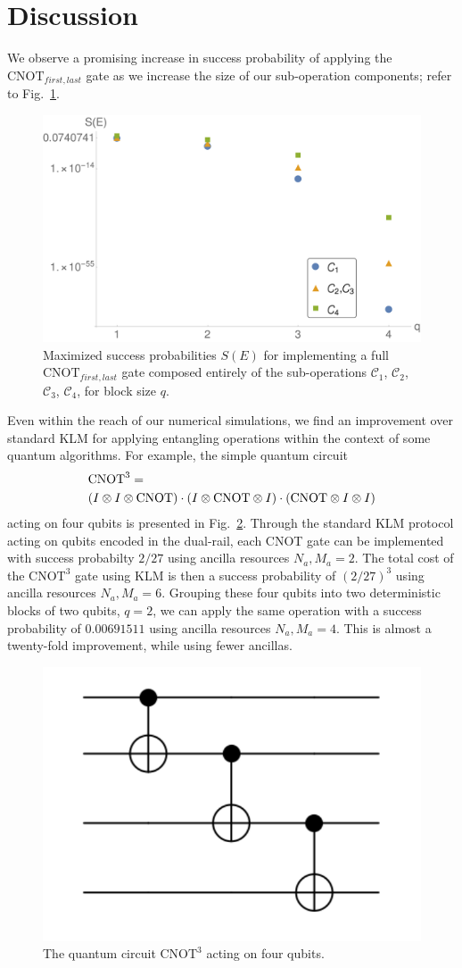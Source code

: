 \documentclass[aps,pra,twocolumn,showpacs,superscriptaddress,floatfix,10pt]{revtex4}
\begin{document}
 \section{Discussion}
 \label{Section Conclusion}
 We observe a promising increase in success probability of applying the $\mbox{CNOT}_{first,last}$ gate as we increase the size of our sub-operation components; refer to Fig.~\ref{Figure - Block Encoding Results}. 
 \begin{figure}[h]
  	\centering
  	\includegraphics[width=0.5 \textwidth]{./blockencodingresults.pdf}
  	\caption{Maximized success probabilities $S(E)$ for implementing a full $\mbox{CNOT}_{first,last}$ gate composed entirely of the sub-operations $\mathcal{C}_1$, $\mathcal{C}_2$, $\mathcal{C}_3$, $\mathcal{C}_4$, for block size $q$.}
  	\label{Figure - Block Encoding Results}
  \end{figure}
Even within the reach of our numerical simulations, we find an improvement over standard KLM for applying entangling operations within the context of some quantum algorithms. For example, the simple quantum circuit 
 \begin{eqnarray}
 \small & \mbox{CNOT}^3 = \\ \small \nonumber & (I \otimes I \otimes \mbox{CNOT}) \cdot (I \otimes  \mbox{CNOT} \otimes I) \cdot (\mbox{CNOT} \otimes I \otimes I)
 \end{eqnarray}
 acting on four qubits is presented in Fig.~\ref{Three CNOTs}. Through the standard KLM protocol acting on qubits encoded in the dual-rail, each CNOT gate can be implemented with success probabilty $2/27$ using ancilla resources $N_a,M_a=2$. The total cost of the $\mbox{CNOT}^3$ gate using KLM is then a success probability of $(2/27)^3$ using ancilla resources $ N_a,M_a = 6 $. Grouping these four qubits into two deterministic blocks of two qubits, $q=2$, we can apply the same operation with a success probability of $0.00691511$ using ancilla resources $ N_a,M_a=4 $. This is almost a twenty-fold improvement, while using fewer ancillas.
 \begin{figure}[ht]
 	\centering
 	\includegraphics[width=0.25 \textwidth]{./ThreeCNOTs.pdf}
 	\caption{The quantum circuit $\mbox{CNOT}^3$ acting on four qubits.}
 	\label{Three CNOTs}
 \end{figure}
\end{document}

